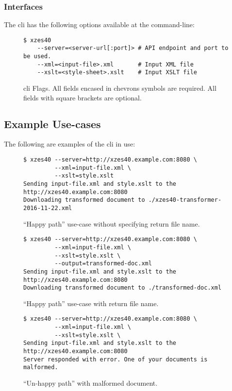 \begin{enmerate}
\begin{itemzie}
\subsubsection{Interfaces}

The \gls{cli} has the following options available at the command-line:
\begin{figure}
    \begin{lstlisting}
$ xzes40
    --server=<server-url[:port]> # API endpoint and port to be used.
    --xml=<input-file>.xml       # Input XML file
    --xslt=<style-sheet>.xslt    # Input XSLT file
    \end{lstlisting}
    \caption{\gls{cli} Flags. All fields encased in chevrons symbols are required. All fields with square brackets are optional.}
\end{figure}

\subsection{Example Use-cases}

The following are examples of the \gls{cli} in use:

\begin{figure}
    \begin{lstlisting}
$ xzes40 --server=http://xzes40.example.com:8080 \
         --xml=input-file.xml \
         --xslt=style.xslt
Sending input-file.xml and style.xslt to the http://xzes40.example.com:8080
Downloading transformed document to ./xzes40-transformer-2016-11-22.xml
    \end{lstlisting}
    \caption{``Happy path'' use-case without specifying return file name.}
\end{figure}


\begin{figure}
    \begin{lstlisting}
$ xzes40 --server=http://xzes40.example.com:8080 \
         --xml=input-file.xml \
         --xslt=style.xslt \
         --output=transformed-doc.xml
Sending input-file.xml and style.xslt to the http://xzes40.example.com:8080
Downloading transformed document to ./transformed-doc.xml
    \end{lstlisting}
   \caption{``Happy path'' use-case with return file name.}
\end{figure}

\begin{figure}
    \begin{lstlisting}
$ xzes40 --server=http://xzes40.example.com:8080 \
         --xml=input-file.xml \
         --xslt=style.xslt \
Sending input-file.xml and style.xslt to the http://xzes40.example.com:8080
Server responded with error. One of your documents is malformed.
    \end{lstlisting}
    \caption{``Un-happy path'' with malformed document.}
\end{figure}



\end{itemzie}
\end{enmerate}
